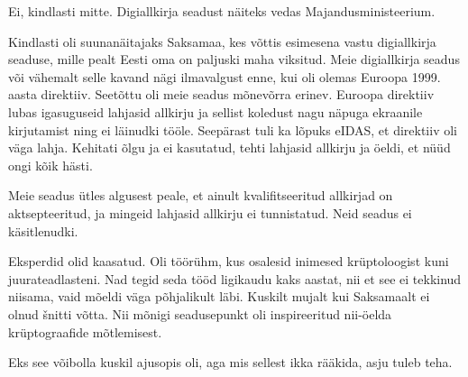 
Ei, kindlasti mitte. Digiallkirja seadust näiteks vedas 
Majandusministeerium.


Kindlasti oli suunanäitajaks Saksamaa, kes võttis esimesena vastu 
digiallkirja seaduse, mille pealt Eesti oma on paljuski maha viksitud. Meie 
digiallkirja seadus või vähemalt selle kavand nägi ilmavalgust enne, kui 
oli olemas Euroopa 1999. aasta direktiiv. Seetõttu oli meie seadus mõnevõrra erinev. Euroopa 
direktiiv lubas igasuguseid lahjasid allkirju ja sellist koledust nagu 
näpuga ekraanile kirjutamist ning ei läinudki tööle. Seepärast tuli ka 
lõpuks eIDAS, et direktiiv 
oli väga lahja. Kehitati õlgu ja ei kasutatud, tehti lahjasid allkirju ja 
öeldi, et nüüd ongi kõik hästi. 

Meie seadus ütles algusest peale, et ainult 
kvalifitseeritud allkirjad on aktsepteeritud, ja mingeid lahjasid allkirju ei 
tunnistatud. Neid seadus ei käsitlenudki. 


Eksperdid olid kaasatud. Oli töörühm, kus osalesid
inimesed krüptoloogist kuni juurateadlasteni. Nad tegid seda tööd ligikaudu
kaks aastat, nii et see ei tekkinud niisama, vaid mõeldi väga põhjalikult 
läbi. Kuskilt mujalt kui Saksamaalt ei olnud šnitti võtta. Nii mõnigi 
seadusepunkt oli inspireeritud nii-öelda krüptograafide mõtlemisest. 


Eks see võibolla kuskil ajusopis oli, aga mis sellest ikka rääkida, asju 
tuleb teha. 


